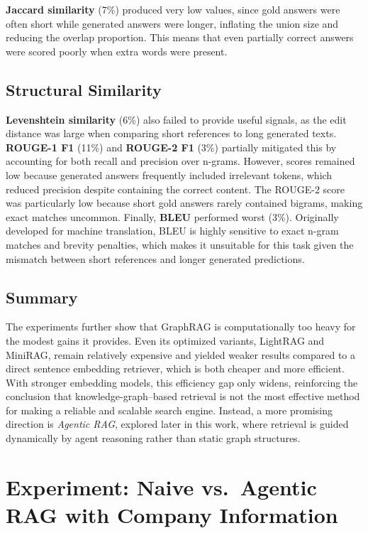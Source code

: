 \textbf{Jaccard similarity} (7\%) produced very low values, since gold answers were often short while generated answers were longer, inflating the union size and reducing the overlap proportion. 
This means that even partially correct answers were scored poorly when extra words were present.

\subsection{Structural Similarity} 
\textbf{Levenshtein similarity} (6\%) also failed to provide useful signals, as the edit distance was large when comparing short references to long generated texts.  
\textbf{ROUGE-1 F1} (11\%) and \textbf{ROUGE-2 F1} (3\%) partially mitigated this by accounting for both recall and precision over n-grams. 
However, scores remained low because generated answers frequently included irrelevant tokens, which reduced precision despite containing the correct content. 
The ROUGE-2 score was particularly low because short gold answers rarely contained bigrams, making exact matches uncommon.  
Finally, \textbf{BLEU} performed worst (3\%). 
Originally developed for machine translation, BLEU is highly sensitive to exact n-gram matches and brevity penalties, which makes it unsuitable for this task given the mismatch between short references and longer generated predictions.

\subsection{Summary}
The experiments further show that GraphRAG is computationally too heavy for the modest gains it provides. 
Even its optimized variants, LightRAG and MiniRAG, remain relatively expensive and yielded weaker results compared to a direct sentence embedding retriever, which is both cheaper and more efficient. 
With stronger embedding models, this efficiency gap only widens, reinforcing the conclusion that knowledge-graph–based retrieval is not the most effective method for making a reliable and scalable search engine. 
Instead, a more promising direction is \emph{Agentic RAG}, explored later in this work, where retrieval is guided dynamically by agent reasoning rather than static graph structures.

\section{Experiment: Naive vs.\ Agentic RAG with Company Information}

